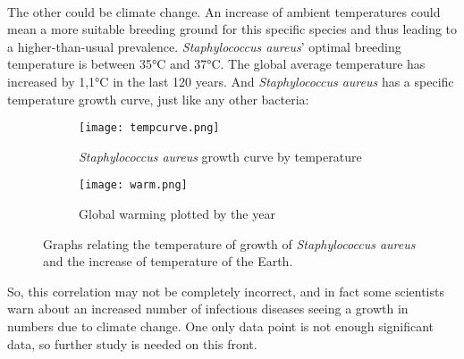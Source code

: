 \paragraph{}The other could be climate change. An increase of ambient temperatures could mean a more suitable breeding ground for this specific species and thus leading to a higher-than-usual prevalence. \emph{Staphylococcus aureus}' optimal breeding temperature is between 35\si{\celsius} and 37\si{\celsius}. The global average temperature has increased by 1,1\si{\celsius}\cite{gmsGMSAnnualGlobal2016} in the last 120 years. And \emph{Staphylococcus aureus} has a specific temperature growth curve, just like any other bacteria:\begin{figure}[H]\centering\begin{subfigure}[b]{0.4\linewidth}\texttt{[image: tempcurve.png]}\caption{\emph{Staphylococcus aureus} growth curve by temperature\cite{FigEffectTemperature2022}}\end{subfigure}\begin{subfigure}[b]{0.4\linewidth}\texttt{[image: warm.png]}\caption{Global warming plotted by the year\cite{GlobalWarming2010}}\end{subfigure}\caption{Graphs relating the temperature of growth of \emph{Staphylococcus aureus} and the increase of temperature of the Earth.}\end{figure}So, this correlation may not be completely incorrect, and in fact some scientists warn about an increased number of infectious diseases seeing a growth in numbers due to climate change. One only data point is not enough significant data, so further study is needed on this front.
